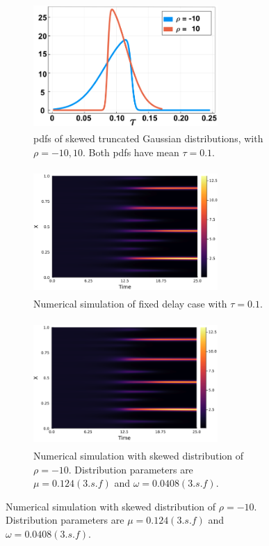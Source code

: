 \begin{figure}[H]
    \centering
    \begin{subfigure}[t]{0.45\textwidth}
        \centering
        \includegraphics[width=7cm,height=4.75cm]{skewdist.png}
        \caption{pdfs of skewed truncated Gaussian distributions, with $\rho=-10,10$. Both pdfs have mean $\tau=0.1$.}
        \label{}
    \end{subfigure}
    \hfill
    \begin{subfigure}[t]{0.45\textwidth}
        \centering
        \includegraphics[width=7cm,height=4.75cm]{fixp1.png}
        \caption{Numerical simulation of fixed delay case with $\tau=0.1$.}
        \label{}
    \end{subfigure}
    \hfill
    \begin{subfigure}[t]{0.45\textwidth}
        \centering
        \includegraphics[width=7cm,height=4.75cm]{skewm10.png}
        \caption{Numerical simulation with skewed distribution of $\rho=-10$. Distribution parameters are $\mu=0.124(3.s.f)$ and $\omega=0.0408(3.s.f)$.}
        \label{}
    \end{subfigure}

\end{figure}
